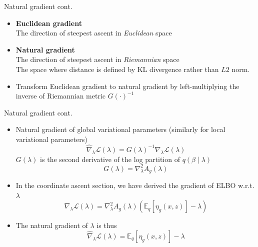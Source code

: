 \documentclass[aspectratio=169]{beamer}
\begin{document}
\begin{frame}{Natural gradient cont.}
    \begin{itemize}
        \item \textbf{Euclidean gradient}\\
        The direction of steepest ascent in \textit{Euclidean} space
        \item \textbf{Natural gradient} \\
        The direction of steepest ascent in \textit{Riemannian} space\\
        The space where distance is defined by KL divergence rather than $L2$ norm.
        \item Transform Euclidean gradient to natural gradient by left-multiplying the inverse of Riemannian metric $G(\cdot)^{-1}$
    \end{itemize}
\end{frame}



\begin{frame}{Natural gradient cont.}
    \begin{itemize}
        \item Natural gradient of global variational parameters (similarly for local variational parameters)
        \[\hat{\nabla}_{\lambda}\mathcal{L}(\lambda) = G(\lambda)^{-1}\nabla_{\lambda}\mathcal{L}(\lambda)\]
         $G(\lambda)$ is the second derivative of the log partition of $q(\beta \mid \lambda)$
         \[G(\lambda) = \nabla^2_{\lambda}A_g(\lambda)\]
        \item In the coordinate ascent section, we have derived the gradient of ELBO w.r.t. $\lambda$
        \[\nabla_{\lambda}\mathcal{L}(\lambda) = \nabla^2_{\lambda}A_g(\lambda)(\mathbb{E}_q[\eta_g(x,z)] - \lambda)\]
        \item The natural gradient of $\lambda$ is thus
        \[\hat{\nabla}_{\lambda}\mathcal{L}(\lambda) = \mathbb{E}_q[\eta_g(x,z)] - \lambda \]
    \end{itemize}
\end{frame}
\end{document}
